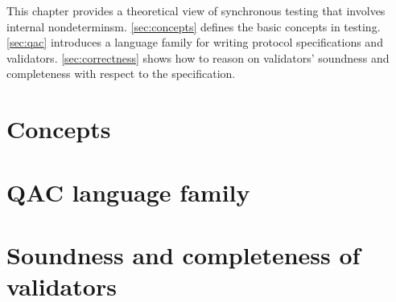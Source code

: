 This chapter provides a theoretical view of synchronous testing that involves
internal nondeterminsm.  \autoref{sec:concepts} defines the basic concepts in
testing.  \autoref{sec:qac} introduces a language family for writing protocol
specifications and validators.  \autoref{sec:correctness} shows how to reason on
validators' soundness and completeness with respect to the specification.

\section{Concepts}
\label{sec:concepts}


\section{QAC language family}
\label{sec:qac}


\section{Soundness and completeness of validators}
\label{sec:correctness}

